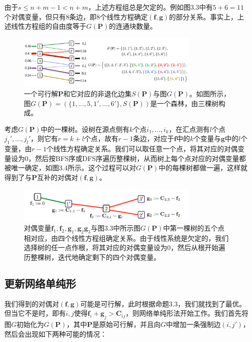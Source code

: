 \documentclass[cn,10pt,math=newtx,citestyle=gb7714-2015,bibstyle=gb7714-2015]{elegantbook}
\begin{document}
由于$s\leq n+m-1<n+m$，上述方程组总是欠定的。例如图3.3中有$5+6=11$个对偶变量，但只有$8$条边，即$8$个线性方程确定$(\mathbf{f,g})$的部分关系。事实上，上述线性方程组的自由度等于$G(\mathbf{P})$的连通块数量。

\begin{figure}[H]
    \centering
    \includegraphics[width=0.8\textwidth]{figure/fig3.3.png}
    \caption{一个可行解$\mathbf{P}$和它对应的非退化边集$S(\mathbf{P})$与图$G(\mathbf{P})$。如图所示，图$G(\mathbf{P})=(\{1,...,5,1',...,6'\},S(\mathbf{P}))$是一个森林，由三棵树构成。}
    \label{图3.3}
\end{figure}

考虑$G(\mathbf{P})$中的一棵树。设树在源点侧有$k$个点$i_1,...,i_k$，在汇点测有$l$个点$j_1',...,j_l'$，则它有$r=k+l$个点，故有$r-1$条边，对应于$\mathbf{f}$中的$k$个变量与$\mathbf{g}$中的$l$个变量，由$r-1$个线性方程确定关系。我们可以取任意一个点，将其对应的对偶变量设为$0$，然后按BFS序或DFS序遍历整棵树，从而树上每个点对应的对偶变量都被唯一确定，如图3.4所示。这个过程可以对$G(\mathbf{P})$中的每棵树都做一遍，这样就得到了与$\mathbf{P}$互补的对偶对$(\mathbf{f,g})$。

\begin{figure}[H]
    \centering
    \includegraphics[width=0.8\textwidth]{figure/fig3.4.png}
    \caption{对偶变量$\mathbf{f}_1,\mathbf{f}_2,\mathbf{g}_1,\mathbf{g}_2\mathbf{g}_3$与图3.3中所示图$G(\mathbf{P})$中第一棵树的五个点相对应，由四个线性方程组确定关系。由于线性系统是欠定的，我们选择树的任一点作根，将其对应的对偶变量设为$0$，然后从根开始遍历整棵树，迭代地确定剩下的四个对偶变量。}
    \label{图3.4}
\end{figure}

\subsection{更新网络单纯形}

我们得到的对偶对$(\mathbf{f,g})$可能是可行解，此时根据命题3.3，我们就找到了最优。但当它不是时，即有$i,j$使得$\mathbf{f}_i+\mathbf{g}_j>\mathbf{C}_{ij}$，则网络单纯形法开始工作。我们首先将图$G$初始化为$G(\mathbf{P})$，其中$\mathbf{P}$是原始可行解，并且向$G$中增加一条强制边$(i,j')$，然后会出现如下两种可能的情况：
\end{document}
